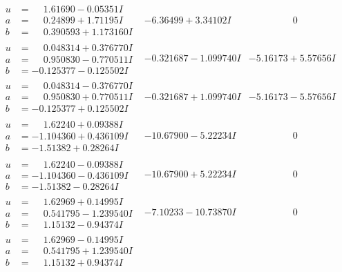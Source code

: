 \documentclass[1p]{elsarticle_modified}
\theoremstyle{definition}
\begin{document}
$$\begin{array}{c|c|c}
\begin{aligned}
u &= \phantom{-}1.61690 - 0.05351 I \\
a &= \phantom{-}0.24899 + 1.71195 I \\
b &= \phantom{-}0.390593 + 1.173160 I\end{aligned}
 & -6.36499 + 3.34102 I & \phantom{-0.000000 } 0 \\ \hline\begin{aligned}
u &= \phantom{-}0.048314 + 0.376770 I \\
a &= \phantom{-}0.950830 - 0.770511 I \\
b &= -0.125377 - 0.125502 I\end{aligned}
 & -0.321687 - 1.099740 I & -5.16173 + 5.57656 I \\ \hline\begin{aligned}
u &= \phantom{-}0.048314 - 0.376770 I \\
a &= \phantom{-}0.950830 + 0.770511 I \\
b &= -0.125377 + 0.125502 I\end{aligned}
 & -0.321687 + 1.099740 I & -5.16173 - 5.57656 I \\ \hline\begin{aligned}
u &= \phantom{-}1.62240 + 0.09388 I \\
a &= -1.104360 + 0.436109 I \\
b &= -1.51382 + 0.28264 I\end{aligned}
 & -10.67900 - 5.22234 I & \phantom{-0.000000 } 0 \\ \hline\begin{aligned}
u &= \phantom{-}1.62240 - 0.09388 I \\
a &= -1.104360 - 0.436109 I \\
b &= -1.51382 - 0.28264 I\end{aligned}
 & -10.67900 + 5.22234 I & \phantom{-0.000000 } 0 \\ \hline\begin{aligned}
u &= \phantom{-}1.62969 + 0.14995 I \\
a &= \phantom{-}0.541795 - 1.239540 I \\
b &= \phantom{-}1.15132 - 0.94374 I\end{aligned}
 & -7.10233 - 10.73870 I & \phantom{-0.000000 } 0 \\ \hline\begin{aligned}
u &= \phantom{-}1.62969 - 0.14995 I \\
a &= \phantom{-}0.541795 + 1.239540 I \\
b &= \phantom{-}1.15132 + 0.94374 I\end{aligned}

\end{array}$$
\end{document}
